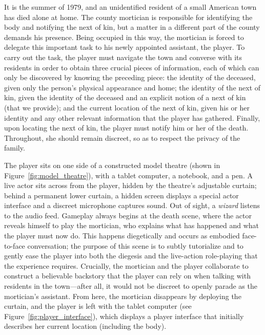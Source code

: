 \documentclass[letterpaper]{article}
\begin{document}
It is the summer of 1979, and an unidentified resident of a small American town has died alone at home. The county mortician is responsible for identifying the body and notifying the next of kin, but a matter in a different part of the county demands his presence. Being occupied in this way, the mortician is forced to delegate this important task to his newly appointed assistant, the player. To carry out the task, the player must navigate the town and converse with its residents in order to obtain three crucial pieces of information, each of which can only be discovered by knowing the preceding piece: the identity of the deceased, given only the person's physical appearance and home; the identity of the next of kin, given the identity of the deceased and an explicit notion of a next of kin (that we provide); and the current location of the next of kin, given his or her identity and any other relevant information that the player has gathered. Finally, upon locating the next of kin, the player must notify him or her of the death. Throughout, she should remain discreet, so as to respect the privacy of the family.

The player sits on one side of a constructed model theatre (shown in Figure~\ref{fig:model_theatre}), with a tablet computer, a notebook, and a pen. A live actor sits across from the player, hidden by the theatre's adjustable curtain; behind a permanent lower curtain, a hidden screen displays a special actor interface and a discreet microphone captures sound. Out of sight, a \textit{wizard} listens to the audio feed. Gameplay always begins at the death scene, where the actor reveals himself to play the mortician, who explains what has happened and what the player must now do. This happens diegetically and occurs as embodied face-to-face conversation; the purpose of this scene is to subtly tutorialize and to gently ease the player into both the diegesis and the live-action role-playing that the experience requires. Crucially, the mortician and the player collaborate to construct a believable backstory that the player can rely on when talking with residents in the town---after all, it would not be discreet to openly parade as the mortician's assistant. From here, the mortician disappears by deploying the curtain, and the player is left with the tablet computer (see Figure~\ref{fig:player_interface}), which displays a player interface that initially describes her current location (including the body).
\end{document}
